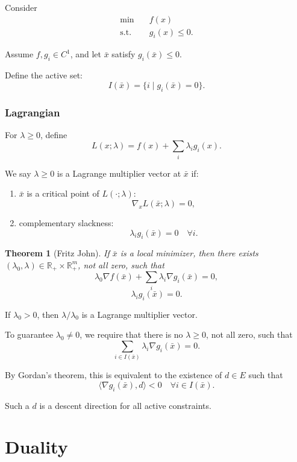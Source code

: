 \documentclass[12pt,oneside]{book}
\numberwithin{equation}{section}
\theoremstyle{definition}
\theoremstyle{plain}
\newtheorem{theorem}{Theorem}[section]
\theoremstyle{remark}
\begin{document}
Consider
\[
\begin{aligned}
\min \quad & f(x) \\
\text{s.t.} \quad & g_i(x) \le 0.
\end{aligned}
\]

Assume $f,g_i \in C^1$, and let $\bar{x}$ satisfy $g_i(\bar{x}) \le 0$.

Define the active set:
\[
I(\bar{x}) = \{ i \mid g_i(\bar{x}) = 0 \}.
\]

\subsection*{Lagrangian}

For $\lambda \ge 0$, define
\[
L(x;\lambda) = f(x) + \sum_i \lambda_i g_i(x).
\]

We say $\lambda \ge 0$ is a Lagrange multiplier vector at $\bar{x}$ if:
\begin{enumerate}
\item $\bar{x}$ is a critical point of $L(\cdot;\lambda)$:
\[
\nabla_x L(\bar{x};\lambda) = 0,
\]
\item complementary slackness:
\[
\lambda_i g_i(\bar{x}) = 0 \quad \forall i.
\]
\end{enumerate}

\begin{theorem}[Fritz John]
If $\bar{x}$ is a local minimizer, then there exists $(\lambda_0,\lambda) \in \mathbb{R}_+ \times \mathbb{R}_+^m$, not all zero, such that
\[
\lambda_0 \nabla f(\bar{x}) + \sum_i \lambda_i \nabla g_i(\bar{x}) = 0,
\]
\[
\lambda_i g_i(\bar{x}) = 0.
\]
\end{theorem}

If $\lambda_0 > 0$, then $\lambda/\lambda_0$ is a Lagrange multiplier vector.

\medskip

To guarantee $\lambda_0 \neq 0$, we require that there is no $\lambda \ge 0$, not all zero, such that
\[
\sum_{i \in I(\bar{x})} \lambda_i \nabla g_i(\bar{x}) = 0.
\]

By Gordan's theorem, this is equivalent to the existence of $d \in E$ such that
\[
\langle \nabla g_i(\bar{x}), d \rangle < 0 \quad \forall i \in I(\bar{x}).
\]

Such a $d$ is a descent direction for all active constraints.

\chapter{Duality}
\end{document}
